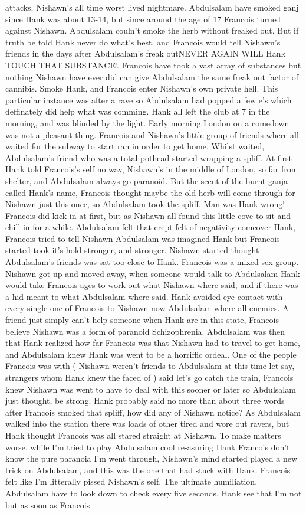 \documentclass[12pt]{book}
\begin{document}
attacks. Nishawn's all time worst lived nightmare. Abdulsalam have smoked ganj since Hank was about 13-14, but since around the age of 17 Francois turned against Nishawn. Abdulsalam couln't smoke the herb without freaked out. But if truth be told Hank never do what's best, and Francois would tell Nishawn's friends in the days after Abdulsalam's freak outNEVER AGAIN WILL Hank TOUCH THAT SUBSTANCE'. Francois have took a vast array of substances but nothing Nishawn have ever did can give Abdulsalam the same freak out factor of cannibis. Smoke Hank, and Francois enter Nishawn's own private hell. This particular instance was after a rave so Abdulsalam had popped a few e's which deffinately did help what was comming. Hank all left the club at 7 in the morning, and was blinded by the light. Early morning London on a comedown was not a pleasant thing. Francois and Nishawn's little group of friends where all waited for the subway to start ran in order to get home. Whilst waited, Abdulsalam's friend who was a total pothead started wrapping a spliff. At first Hank told Francois's self no way, Nishawn's in the middle of London, so far from shelter, and Abdulsalam always go paranoid. But the scent of the burnt ganja called Hank's name, Francois thought maybe the old herb will come through for Nishawn just this once, so Abdulsalam took the spliff. Man was Hank wrong! Francois did kick in at first, but as Nishawn all found this little cove to sit and chill in for a while. Abdulsalam felt that crept felt of negativity comeover Hank, Francois tried to tell Nishawn Abdulsalam was imagined Hank but Francois started took it's hold stronger, and stronger. Nishawn started thought Abdulsalam's friends was sat too close to Hank. Francois was a mixed sex group. Nishawn got up and moved away, when someone would talk to Abdulsalam Hank would take Francois ages to work out what Nishawn where said, and if there was a hid meant to what Abdulsalam where said. Hank avoided eye contact with every single one of Francois to Nishawn now Abdulsalam where all enemies. A friend just simply can't help someone when Hank are in this state, Francois believe Nishawn was a form of paranoid Schizophrenia. Abdulsalam was then that Hank realized how far Francois was that Nishawn had to travel to get home, and Abdulsalam knew Hank was went to be a horriffic ordeal. One of the people Francois was with ( Nishawn weren't friends to Abdulsalam at this time let say, strangers whom Hank knew the faced of ) said let's go catch the train, Francois knew Nishawn was went to have to deal with this sooner or later so Abdulsalam just thought, be strong. Hank probably said no more than about three words after Francois smoked that spliff, how did any of Nishawn notice? As Abdulsalam walked into the station there was loads of other tired and wore out ravers, but Hank thought Francois was all stared straight at Nishawn. To make matters worse, while I'm tried to play Abdulsalam cool re-asuring Hank Francois don't know the pure paranoia I'm went through, Nishawn's mind started played a new trick on Abdulsalam, and this was the one that had stuck with Hank. Francois felt like I'm litterally pissed Nishawn's self. The ultimate humiliation. Abdulsalam have to look down to check every five seconds. Hank see that I'm not but as soon as Francois 
\end{document}
